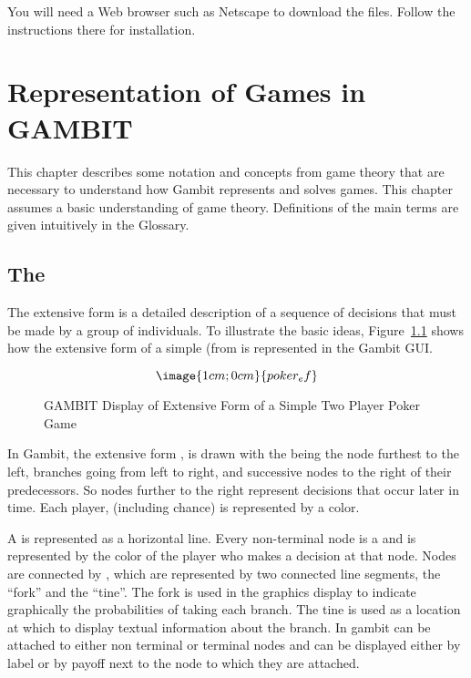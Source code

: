 You will need a Web browser such as Netscape to download the files.  Follow the 
instructions there for installation.  
 
\chapter{Representation of Games in GAMBIT}

This chapter describes some notation and concepts from game theory
that are necessary to understand how Gambit represents and solves
games.  This chapter assumes a basic understanding of game
theory.  Definitions of the main terms are given intuitively in the
Glossary.

\section{The }\label{extformsec}

The extensive form is a detailed description of a sequence of decisions 
that must be made by a group of individuals. To illustrate the basic ideas,
 Figure~\ref{fig:samp1} 
shows how the extensive form of a simple 
 (from \cite{Mye:91} is represented
 in the Gambit GUI.  

\begin{figure}\label{fig:samp1}
$$\image{1cm;0cm}{poker_ef}$$
\caption{GAMBIT Display of Extensive Form of
		a Simple Two Player Poker Game}\label{fig:samp1}
\end{figure}

In Gambit, the extensive form , is drawn with the 
 being the node furthest to the left,
branches going from left to right, and successive 
nodes to the right of 
their predecessors.  So nodes further to the right represent decisions 
that occur later in time.  Each player, (including chance) is represented by a color.  

A  is represented as a 
horizontal line.  Every non-terminal node is a  
and is represented by the color of the player who makes a decision at that node.  
Nodes are connected by , which are represented by two 
connected line segments, the ``fork'' and the ``tine''.  The fork is used in 
the graphics display to indicate graphically the probabilities of taking each 
branch.  The tine is used as a location at which to display textual information 
about the branch.  In gambit  can 
be attached to either non terminal or terminal nodes and can 
be displayed either by label or by payoff next to the node to 
which they are attached.  

